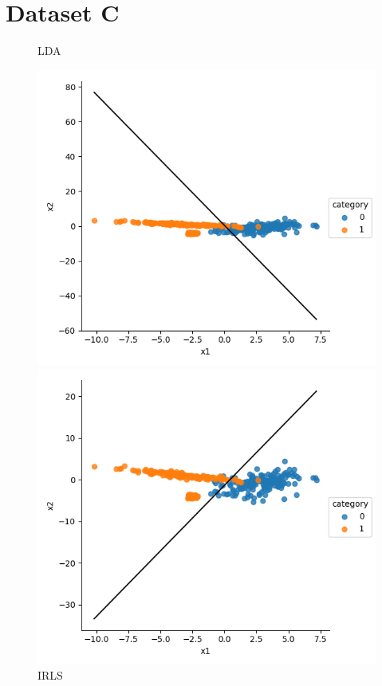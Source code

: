 \documentclass[a4paper]{article}
\begin{document}
\section{Dataset C}
\begin{figure}[h]
\centering
\begin{minipage}{0,45\textwidth}
\caption{LDA}
\includegraphics[scale=.5]{c_lda.png}
\end{minipage}
\begin{minipage}{0,45\textwidth}
\caption{IRLS}
\includegraphics[scale=.5]{c_irls.png}

\end{minipage}
\end{figure}
\end{document}
